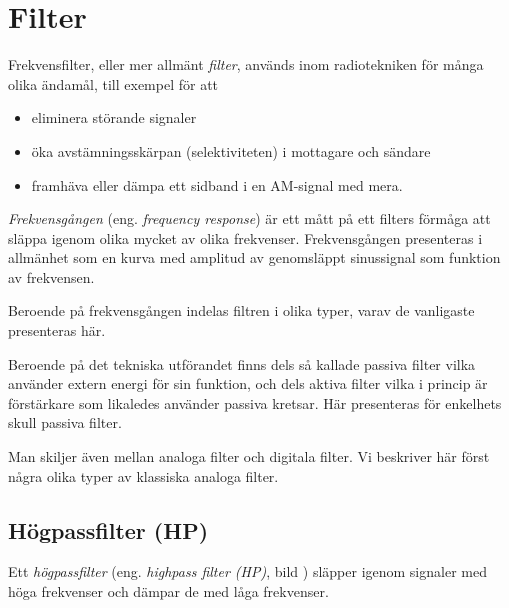 \section{Filter}
\label{filter}

Frekvensfilter, eller mer allmänt \emph{filter}, används inom radiotekniken för
många olika ändamål, till exempel för att
\begin{itemize}
  \item eliminera störande signaler
  \item öka avstämningsskärpan (selektiviteten) i mottagare och sändare
  \item framhäva eller dämpa ett sidband i en AM-signal med mera.
\end{itemize}

\emph{Frekvensgången} (eng. \emph{frequency response}) är ett mått på ett
filters förmåga att släppa igenom olika mycket av olika frekvenser.
Frekvensgången presenteras i allmänhet som en kurva med amplitud av genomsläppt
sinussignal som funktion av frekvensen.

Beroende på frekvensgången indelas filtren i olika typer, varav de vanligaste
presenteras här.

Beroende på det tekniska utförandet finns dels så kallade passiva filter vilka
använder extern energi för sin funktion, och dels aktiva filter vilka i princip
är förstärkare som likaledes använder passiva kretsar.
Här presenteras för enkelhets skull passiva filter.

Man skiljer även mellan analoga filter och digitala filter.
Vi beskriver här först några olika typer av klassiska analoga filter.

\subsection{Högpassfilter (HP)}



Ett \emph{högpassfilter} (eng. \emph{highpass filter (HP)}, bild ) släpper igenom
signaler med höga frekvenser och dämpar de med låga frekvenser.

